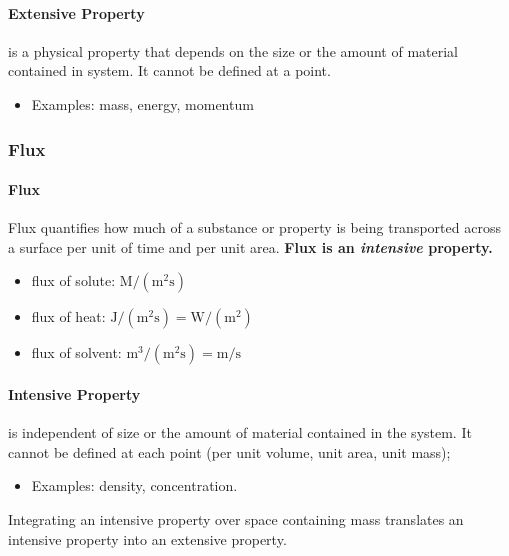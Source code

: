 \documentclass[12pt, a4paper]{article}
\begin{document}
\paragraph{Extensive Property} is a physical property that depends on the size or the amount of material contained in system. It cannot be defined at a point.
\begin{itemize}
 \item Examples: mass, energy, momentum
\end{itemize}

\subsubsection{Flux}
\paragraph{Flux} Flux quantifies how much of a substance or property is being transported across a surface per unit of time and per unit area. \textbf{Flux is an \emph{intensive} property.}

\begin{tcolorbox}[breakable, title = \textbf{Typical Units of Fluxes}]
    \begin{itemize}
        \item flux of solute: $\displaystyle \mathrm{M/(m^{2}s)}$
        \item flux of heat: $\displaystyle \mathrm{J/(m^{2}s) = W/(m^{2})}$
        \item flux of solvent: $\displaystyle \mathrm{m^{3}/(m^{2}s) = m/s}$
    \end{itemize}
\end{tcolorbox}

\paragraph{Intensive Property} is independent of size or the amount of material contained in the system. It cannot be defined at each point (per unit volume, unit area, unit mass);
\begin{itemize}
    \item Examples: density, concentration.
\end{itemize}

Integrating an intensive property over space containing mass translates an intensive property into an extensive property.
\end{document}
